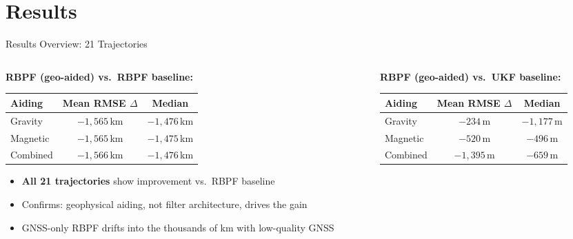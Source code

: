 \documentclass[aspectratio=169]{beamer}
\begin{document}
\section{Results}

\begin{frame}{Results Overview: 21 Trajectories}
    \begin{columns}
        \begin{column}{0.50\textwidth}
            \textbf{RBPF (geo-aided) vs.\ RBPF baseline:}

            \vspace{0.3em}
            \begin{table}
                \small
                \begin{tabular}{lcc}
                    \toprule
                    Aiding & Mean RMSE $\Delta$ & Median \\
                    \midrule
                    Gravity    & $-1{,}565$\,km & $-1{,}476$\,km \\
                    Magnetic   & $-1{,}565$\,km & $-1{,}475$\,km \\
                    Combined   & $-1{,}566$\,km & $-1{,}476$\,km \\
                    \bottomrule
                \end{tabular}
            \end{table}

            \vspace{0.4em}
            \begin{itemize}
                \item \textbf{All 21 trajectories} show improvement vs.\ RBPF baseline
                \item Confirms: geophysical aiding, not filter architecture, drives the gain
                \item GNSS-only RBPF drifts into the thousands of km with low-quality GNSS
            \end{itemize}
        \end{column}
        \begin{column}{0.47\textwidth}
            \textbf{RBPF (geo-aided) vs.\ UKF baseline:}

            \vspace{0.3em}
            \begin{table}
                \small
                \begin{tabular}{lcc}
                    \toprule
                    Aiding & Mean RMSE $\Delta$ & Median \\
                    \midrule
                    Gravity    & $-234$\,m  & $-1{,}177$\,m \\
                    Magnetic   & $-520$\,m  & $-496$\,m \\
                    Combined   & $-1{,}395$\,m & $-659$\,m \\
                    \bottomrule
                \end{tabular}
            \end{table}


\end{column}
\end{columns}
\end{frame}
\end{document}
